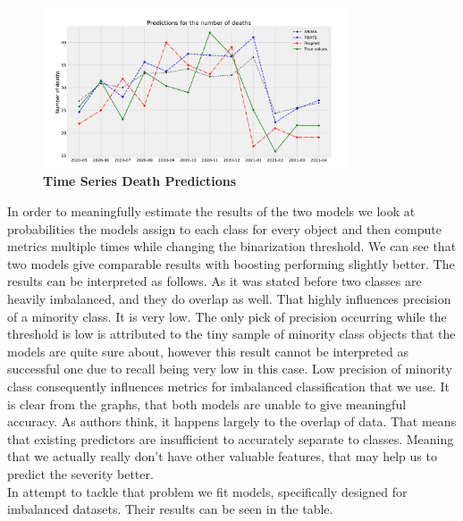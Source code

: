 \begin{figure}[htpb!]
	\centering
	\includegraphics[width=0.8\textwidth]{../imgs/pdf_files/ts_predictions.pdf}
	\caption{\textbf{Time Series Death Predictions}}
	\label{fig:ts_predictions}
\end{figure}
\noindent
In order to meaningfully estimate the results of the two models we look at probabilities the models assign to each class
for every object and then compute metrics multiple times while changing the binarization threshold.
We can see that two models give comparable results with boosting performing slightly better. The results can be interpreted as follows.
As it was stated before two classes are heavily imbalanced, and they do overlap as well.
That highly influences precision of a minority class. It is very low.
The only pick of precision occurring while the threshold is low is attributed to the tiny sample of minority class objects
that the models are quite sure about, however this result cannot be interpreted as successful one due to recall being very low in this case. 
Low precision of minority class consequently influences metrics for imbalanced classification that we use. 
It is clear from the graphs, that both models are unable to give meaningful accuracy.
As authors think, it happens largely to the overlap of data.
That means that existing predictors are insufficient to accurately separate to classes.
Meaning that we actually really don’t have other valuable features, that may help us to predict the severity better. \\
In attempt to tackle that problem we fit models, specifically designed for imbalanced datasets.
Their results can be seen in the table.


